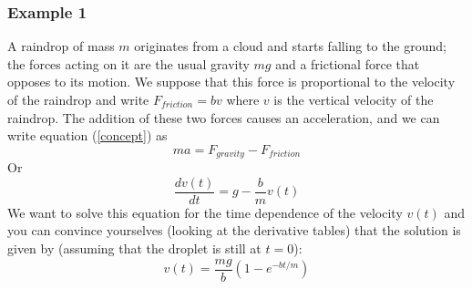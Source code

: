 \subsubsection{Example 1}
A raindrop of mass $m$ originates from a cloud and starts falling to the ground; the forces acting on it are the usual gravity $mg$ and a frictional force that opposes to its motion. We suppose that this force is proportional to the velocity of the raindrop and write $F_{friction}=bv$ where $v$ is the vertical velocity of the raindrop. The addition of these two forces causes an acceleration, and we can write equation (\ref{concept}) as
\begin{equation}
ma=F_{gravity}-F_{friction}
\end{equation}
Or
\begin{equation}
\frac{dv(t)}{dt}=g-\frac{b}{m}v(t)
\end{equation}
We want to solve this equation for the time dependence of the velocity $v(t)$ and you can convince yourselves (looking at the derivative tables) that the solution is given by (assuming that the droplet is still at $t=0$):  
\begin{equation}
v(t)=\frac{mg}{b}(1-e^{-bt/m})
\end{equation}
